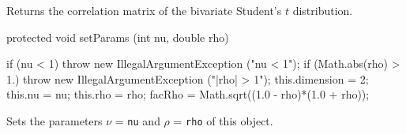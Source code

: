 \begin{tabb}
   Returns the correlation matrix of the bivariate Student's $t$ distribution.
\end{tabb}
\begin{code}

   protected void setParams (int nu, double rho) \begin{hide} {
      if (nu < 1)
         throw new IllegalArgumentException ("nu < 1");
      if (Math.abs(rho) > 1.)
         throw new IllegalArgumentException ("|rho| > 1");
      this.dimension = 2;
      this.nu = nu;
      this.rho = rho; 
      facRho = Math.sqrt((1.0 - rho)*(1.0 + rho));
   }\end{hide}
\end{code}
  \begin{tabb} Sets the parameters $\nu$ = \texttt{nu} and
  $\rho$ = \texttt{rho} of this object.
  \end{tabb}
\begin{code}\begin{hide} 
}\end{hide}
\end{code}
